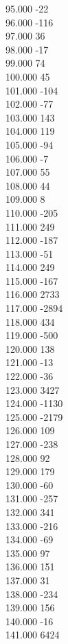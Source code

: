 { 95.000	-22 \\
 96.000	-116 \\
 97.000	36 \\
 98.000	-17 \\
 99.000	74 \\
 100.000	45 \\
 101.000	-104 \\
 102.000	-77 \\
 103.000	143 \\
 104.000	119 \\
 105.000	-94 \\
 106.000	-7 \\
 107.000	55 \\
 108.000	44 \\
 109.000	8 \\
 110.000	-205 \\
 111.000	249 \\
 112.000	-187 \\
 113.000	-51 \\
 114.000	249 \\
 115.000	-167 \\
 116.000	2733 \\
 117.000	-2894 \\
 118.000	434 \\
 119.000	-500 \\
 120.000	138 \\
 121.000	-13 \\
 122.000	-36 \\
 123.000	3427 \\
 124.000	-1130 \\
 125.000	-2179 \\
 126.000	109 \\
 127.000	-238 \\
 128.000	92 \\
 129.000	179 \\
 130.000	-60 \\
 131.000	-257 \\
 132.000	341 \\
 133.000	-216 \\
 134.000	-69 \\
 135.000	97 \\
 136.000	151 \\
 137.000	31 \\
 138.000	-234 \\
 139.000	156 \\
 140.000	-16 \\
 141.000	6424 \\
}
